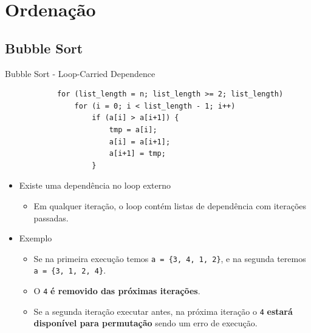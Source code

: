 \section{Ordenação}
	\subsection{Bubble Sort}
	\begin{frame}[fragile]{Bubble Sort - Loop-Carried Dependence}
		\begin{verbatim}
			for (list_length = n; list_length >= 2; list_length) 
				for (i = 0; i < list_length - 1; i++)
					if (a[i] > a[i+1]) { 
						tmp = a[i];
						a[i] = a[i+1];
						a[i+1] = tmp;
					}
		\end{verbatim}
					\pause
		\begin{itemize}
			\item Existe uma dependência no loop externo
			\begin{itemize}
				\item Em qualquer iteração, o loop contém listas de dependência com iterações passadas.
			\end{itemize}
			\item Exemplo
			\begin{itemize}
				\item Se na primeira execução temos {\tt a = \{3, 4, 1, 2\}}, e na segunda teremos {\tt a = \{3, 1, 2, 4\}}.
						\pause
				\item O \texttt{4} \textbf{é removido das próximas iterações}.
						\bigskip
						\pause
				\item Se a segunda iteração executar antes, na próxima iteração o \texttt{4} \textbf{estará disponível para permutação} sendo um erro de execução.
			\end{itemize}
		\end{itemize}
\end{frame}


